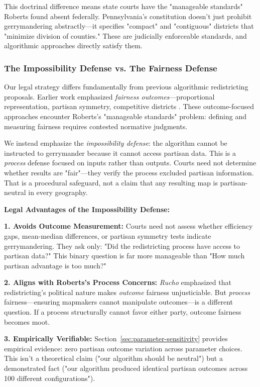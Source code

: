 This doctrinal difference means state courts have the "manageable standards" Roberts found absent federally. Pennsylvania's constitution doesn't just prohibit gerrymandering abstractly—it specifies "compact" and "contiguous" districts that "minimize division of counties." These are judicially enforceable standards, and algorithmic approaches directly satisfy them.

\subsubsection{The Impossibility Defense vs. The Fairness Defense}

Our legal strategy differs fundamentally from previous algorithmic redistricting proposals. Earlier work emphasized \textit{fairness outcomes}—proportional representation, partisan symmetry, competitive districts \citep{stephanopoulos2015partisan,duchin2018gerrymandering}. These outcome-focused approaches encounter Roberts's "manageable standards" problem: defining and measuring fairness requires contested normative judgments.

We instead emphasize the \textit{impossibility defense}: the algorithm cannot be instructed to gerrymander because it cannot access partisan data. This is a \textit{process} defense focused on inputs rather than outputs. Courts need not determine whether results are "fair"—they verify the process excluded partisan information. That is a procedural safeguard, not a claim that any resulting map is partisan-neutral in every geography.

\textbf{Legal Advantages of the Impossibility Defense:}

\textbf{1. Avoids Outcome Measurement:} Courts need not assess whether efficiency gaps, mean-median differences, or partisan symmetry tests indicate gerrymandering. They ask only: "Did the redistricting process have access to partisan data?" This binary question is far more manageable than "How much partisan advantage is too much?"

\textbf{2. Aligns with Roberts's Process Concerns:} \textit{Rucho} emphasized that redistricting's political nature makes \textit{outcome} fairness unjusticiable. But \textit{process} fairness—ensuring mapmakers cannot manipulate outcomes—is a different question. If a process structurally cannot favor either party, outcome fairness becomes moot.

\textbf{3. Empirically Verifiable:} Section~\ref{sec:parameter-sensitivity} provides empirical evidence: zero partisan outcome variation across parameter choices. This isn't a theoretical claim ("our algorithm should be neutral") but a demonstrated fact ("our algorithm produced identical partisan outcomes across 100 different configurations").


